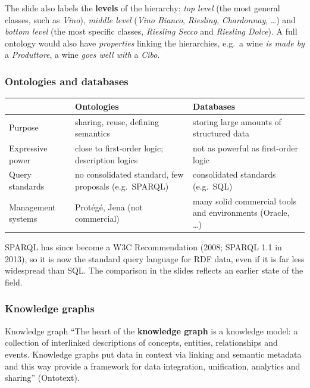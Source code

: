 The slide also labels the \textbf{levels} of the hierarchy: \emph{top level} (the most
general classes, such as \emph{Vino}), \emph{middle level} (\emph{Vino Bianco},
\emph{Riesling}, \emph{Chardonnay}, \ldots) and \emph{bottom level} (the most specific
classes, \emph{Riesling Secco} and \emph{Riesling Dolce}). A full ontology would also
have \emph{properties} linking the hierarchies, e.g.\ a wine \emph{is made by} a
\emph{Produttore}, a wine \emph{goes well with} a \emph{Cibo}.

\subsubsection{Ontologies and databases}

\begin{center}
\small
\begin{tabularx}{\linewidth}{@{}l >{\raggedright\arraybackslash}X >{\raggedright\arraybackslash}X@{}}
\toprule
 & \textbf{Ontologies} & \textbf{Databases} \\
\midrule
Purpose & sharing, reuse, defining semantics & storing large amounts of structured
  data \\
Expressive power & close to first-order logic; description logics & not as powerful as
  first-order logic \\
Query standards & no consolidated standard, few proposals (e.g.\ SPARQL) & consolidated
  standards (e.g.\ SQL) \\
Management systems & Protégé, Jena (not commercial) & many solid commercial tools and
  environments (Oracle, \ldots) \\
\bottomrule
\end{tabularx}
\end{center}

\begin{nbwarning}
SPARQL has since become a W3C Recommendation (2008; SPARQL 1.1 in 2013), so it is now the
standard query language for RDF data, even if it is far less widespread than SQL. The
comparison in the slides reflects an earlier state of the field.
\end{nbwarning}

\subsubsection{Knowledge graphs}

\begin{nbdef}{Knowledge graph}
``The heart of the \textbf{knowledge graph} is a knowledge model: a collection of
interlinked descriptions of concepts, entities, relationships and events. Knowledge
graphs put data in context via linking and semantic metadata and this way provide a
framework for data integration, unification, analytics and sharing'' (Ontotext).
\end{nbdef}

